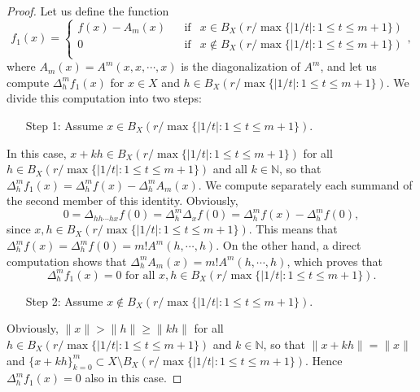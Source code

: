 \documentclass[12pt,a4paper]{amsart}
\theoremstyle{definition}
\begin{document}
\begin{proof}
Let us define the function
 \[
f_1(x)=\left\{
\begin{array}{cccccc}
f(x)-A_m(x) &  & \text{if} &   x\in B_{X}(r/\max\{|1/t|:1\leq t\leq m+1\}) \\
0 &  & \text{if} & x\not\in B_{X}(r/\max\{|1/t|:1\leq t\leq m+1\}) \\
\end{array},
\right.
\]
where $A_m(x)=A^m(x,x,\cdots,x)$ is the diagonalization of $A^m$, and let us compute $\Delta_h^mf_1(x)$ for $x\in X$ and $h\in B_{X}(r/\max\{|1/t|:1\leq t\leq m+1\})$. We divide this computation into two steps:
\begin{itemize}
\item[Step 1:] Assume $x\in B_{X}(r/\max\{|1/t|:1\leq t\leq m+1\})$. 
\end{itemize}
In this case, $x+kh\in  B_{X}(r/\max\{|1/t|:1\leq t\leq m+1\})$ for all $h\in  B_{X}(r/\max\{|1/t|:1\leq t\leq m+1\})$ and all $k\in\mathbb{N}$, so that $\Delta_h^mf_1(x)=\Delta_h^mf(x)-\Delta_h^mA_m(x)$. We compute separately each summand of the second member of this identity. Obviously,
\[
0=\Delta_{hh\cdots hx}f(0)=\Delta^m_h\Delta_xf(0)=\Delta^m_hf(x)-\Delta^m_hf(0),
\] 
since $x,h\in B_{X}(r/\max\{|1/t|:1\leq t\leq m+1\})$. This means that $\Delta^m_hf(x)=\Delta^m_hf(0)=m!A^m(h,\cdots,h)$. On the other hand, a direct computation shows that 
$\Delta_h^mA_m(x)=m!A^m(h,\cdots,h)$, which proves that 
\[
\Delta_h^mf_1(x)=0 \text{ for all } x,h\in B_{X}(r/\max\{|1/t|:1\leq t\leq m+1\}).
\]
\begin{itemize}
\item[Step 2:] Assume $x\not\in B_{X}(r/\max\{|1/t|:1\leq t\leq m+1\})$.
\end{itemize}
Obviously, $\|x\|>\|h\|\geq \|kh\|$ for all $h\in B_{X}(r/\max\{|1/t|:1\leq t\leq m+1\})$ and $k\in\mathbb{N}$, so that 
$\|x+kh\|=\|x\|$ and $\{x+kh\}_{k=0}^m\subset X\setminus B_{X}(r/\max\{|1/t|:1\leq t\leq m+1\})$. Hence $\Delta_h^mf_1(x)=0 $ also in this case. 


\end{proof}
\end{document}
